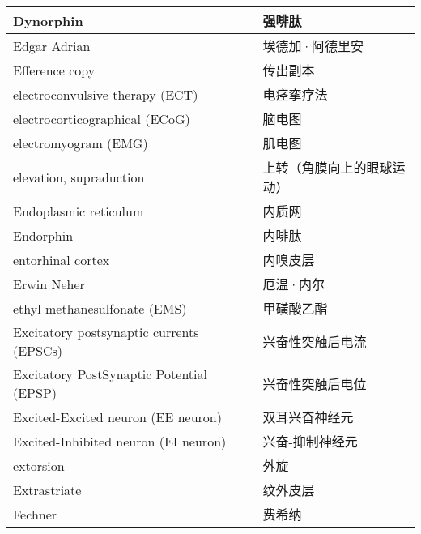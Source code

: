 \begin{longtable}{lll}
	\midrule
	Dynorphin     &&  强啡肽  \\
	
	\midrule
	Edgar Adrian     &&  埃德加·阿德里安  \\
	
	\midrule
	Efference copy     &&  传出副本  \\
	
	\midrule
	electroconvulsive therapy (ECT)     &&  电痉挛疗法  \\
	
	\midrule
	electrocorticographical (ECoG)     &&  脑电图  \\
	
	\midrule
	electromyogram (EMG)     &&  肌电图  \\
	
	\midrule
	elevation, supraduction     &&  上转（角膜向上的眼球运动）  \\
	
	\midrule
	Endoplasmic reticulum     &&  内质网  \\
	
	\midrule
	Endorphin     &&  内啡肽  \\
	
	\midrule
	entorhinal cortex     &&  内嗅皮层  \\
	
	\midrule
	Erwin Neher    &&  厄温·内尔  \\
	
	\midrule
	ethyl methanesulfonate (EMS)    &&  甲磺酸乙酯  \\
	
	\midrule
	Excitatory postsynaptic currents (EPSCs)     &&  兴奋性突触后电流  \\
	
	\midrule
	Excitatory PostSynaptic Potential (EPSP)     &&  兴奋性突触后电位  \\
	
	\midrule
	Excited-Excited neuron (EE neuron)     &&  双耳兴奋神经元  \\
	
	\midrule
	Excited-Inhibited neuron (EI neuron)     && 兴奋-抑制神经元   \\
	
	\midrule
	extorsion     && 外旋   \\
	
	\midrule
	Extrastriate     && 纹外皮层   \\
	
	\midrule
	Fechner     &&  费希纳  \\
	

\end{longtable}
